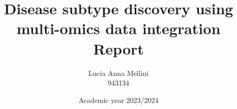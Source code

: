 \documentclass{report}
\begin{document}
\title{\huge{Disease subtype discovery using
multi-omics data integration}\\
\LARGE Report}
\author{Lucia Anna Mellini \\
 943134}
\date {Academic year 2023/2024}
\maketitle

\tableofcontents







\end{document}
